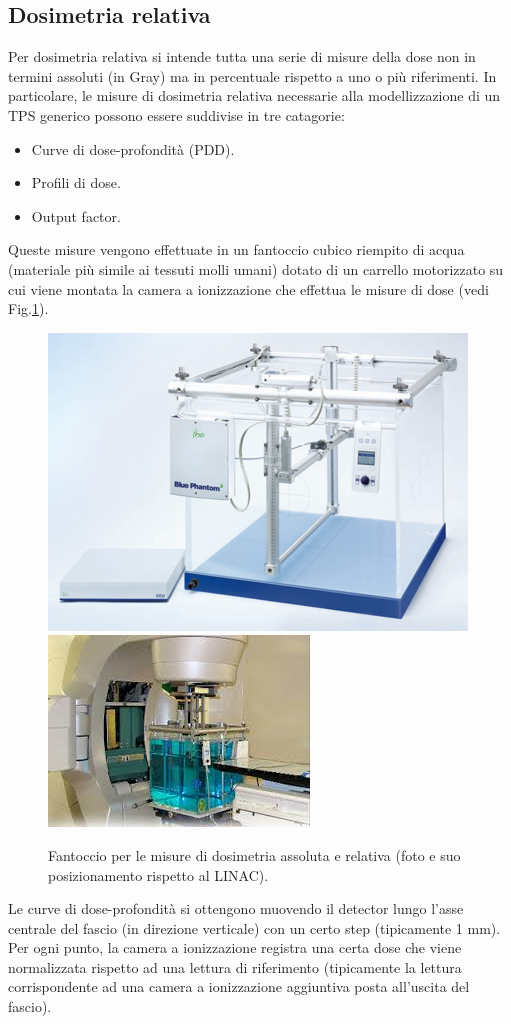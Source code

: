 \subsection{Dosimetria relativa}
\label{sec:dos_rel}
Per dosimetria relativa si intende tutta una serie di misure della dose non in termini assoluti (in Gray) ma in percentuale rispetto a uno o più riferimenti. In particolare, le misure di dosimetria relativa necessarie alla modellizzazione di un TPS generico possono essere suddivise in tre catagorie:
\begin{itemize}
\item Curve di dose-profondità (PDD).
\item Profili di dose.
\item Output factor.
\end{itemize}
Queste misure vengono effettuate in un fantoccio cubico riempito di acqua (materiale più simile ai tessuti molli umani) dotato di un carrello motorizzato su cui viene montata la camera a ionizzazione che effettua le misure di dose (vedi Fig.\ref{fig:wphant}).
\begin{figure}
\centering
\includegraphics[width=.45\textwidth]{./cap2/wphant.jpg}
\includegraphics[width=.45\textwidth]{./cap2/wphant_pos.jpg}
\caption{Fantoccio per le misure di dosimetria assoluta e relativa (foto e suo posizionamento rispetto al LINAC).}
\label{fig:wphant}
\end{figure}

Le curve di dose-profondità si ottengono muovendo il detector lungo l'asse centrale del fascio (in direzione verticale) con un certo step (tipicamente 1 mm).\\
Per ogni punto, la camera a ionizzazione registra una certa dose che viene normalizzata rispetto ad una lettura di riferimento (tipicamente la lettura corrispondente ad una camera a ionizzazione aggiuntiva posta all'uscita del fascio).

